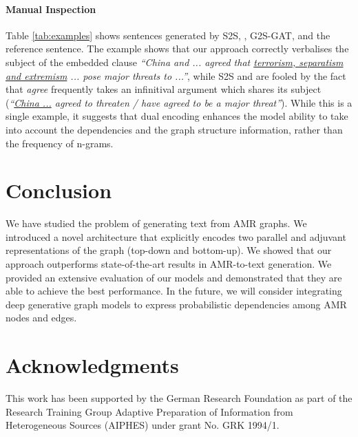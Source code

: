 \documentclass[11pt,a4paper]{article}
\begin{document}
\paragraph{Manual Inspection}
Table \ref{tab:examples} shows sentences generated by {\selectfont S2S}, \citet{song-etal-acl2018}, {\selectfont G2S-GAT}, and the reference sentence. The example shows that our approach correctly verbalises the subject of the embedded clause \textit{``China and ... agreed that \uline{terrorism, separatism and extremism} ... pose major threats to ...''}, while {\selectfont S2S} and \citet{song-etal-acl2018} are fooled by the fact that \textit{agree} frequently takes  an infinitival argument which shares its subject (\textit{``\uline{China ...} agreed to threaten / have agreed to be a major threat''}).
While this is a single example, it suggests that dual encoding enhances the model ability to take into account the dependencies and the graph structure information, rather than the frequency of n-grams.







\section{Conclusion}
\label{sec:conclusion}

We have studied the problem of generating text from AMR graphs. We introduced a novel architecture that explicitly encodes two parallel and adjuvant representations of the graph (top-down and bottom-up). We showed that our approach outperforms state-of-the-art results in \mbox{AMR-to-text} generation. We provided an extensive evaluation of our models and demonstrated that they are able to achieve the best performance. In the future, we will consider integrating deep generative graph models to express probabilistic dependencies among AMR nodes and edges.





\section*{Acknowledgments}
This work has been supported by the German Research Foundation as part of the Research Training Group Adaptive Preparation of Information from Heterogeneous Sources (AIPHES) under grant No. GRK 1994/1. 




\end{document}
